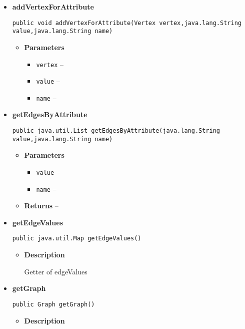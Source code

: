 {{{{{{{{{{{{{{{{\begin{itemize}
{}%
\item{ 
{\bf  addVertexForAttribute}\\
\begin{lstlisting}[frame=none]
public void addVertexForAttribute(Vertex vertex,java.lang.String value,java.lang.String name)\end{lstlisting} %
\begin{itemize}
\item{
{\bf  Parameters}
  \begin{itemize}
   \item{
\texttt{vertex} -- }
   \item{
\texttt{value} -- }
   \item{
\texttt{name} -- }
  \end{itemize}
}%
\end{itemize}
}%
\item{ 
{\bf  getEdgesByAttribute}\\
\begin{lstlisting}[frame=none]
public java.util.List getEdgesByAttribute(java.lang.String value,java.lang.String name)\end{lstlisting} %
\begin{itemize}
\item{
{\bf  Parameters}
  \begin{itemize}
   \item{
\texttt{value} -- }
   \item{
\texttt{name} -- }
  \end{itemize}
}%
\item{{\bf  Returns} -- 
 
}%
\end{itemize}
}%
\item{ 
{\bf  getEdgeValues}\\
\begin{lstlisting}[frame=none]
public java.util.Map getEdgeValues()\end{lstlisting} %
\begin{itemize}
\item{
{\bf  Description}

Getter of edgeValues
}
\end{itemize}
}%
\item{ 
{\bf  getGraph}\\
\begin{lstlisting}[frame=none]
public Graph getGraph()\end{lstlisting} %
\begin{itemize}
\item{
{\bf  Description}

}
\end{itemize}}
\end{itemize}}}}}}}}}}}}}}}}}
